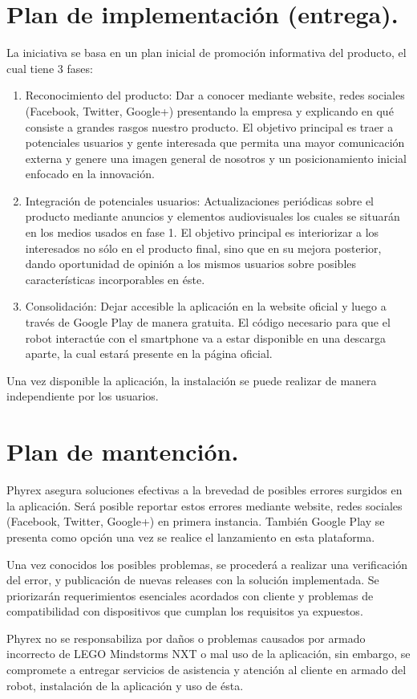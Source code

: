 \section{Plan de implementaci\'on (entrega).}
La iniciativa se basa en un plan inicial de promoci\'on informativa del producto, el cual tiene 3 fases:

\begin{enumerate}
\item Reconocimiento del producto: Dar a conocer mediante website, redes sociales (Facebook, Twitter, Google+) presentando la empresa y explicando en qu\'e consiste a grandes rasgos nuestro producto. El objetivo principal es traer a potenciales usuarios y gente interesada que permita una mayor comunicaci\'on externa y genere una imagen general de nosotros y un posicionamiento inicial enfocado en la innovaci\'on.
\item Integraci\'on de potenciales usuarios: Actualizaciones peri\'odicas sobre el producto mediante anuncios y elementos audiovisuales los cuales se situar\'an en los medios usados en fase 1. El objetivo principal es interiorizar a los interesados no s\'olo en el producto final, sino que en su mejora posterior, dando oportunidad de opini\'on a los mismos usuarios sobre posibles caracter\'isticas incorporables en \'este.
\item Consolidaci\'on: Dejar accesible la aplicaci\'on en la website oficial y luego a trav\'es de Google Play de manera gratuita. El c\'odigo necesario para que el robot interact\'ue con el smartphone va a estar disponible en una descarga aparte, la cual estar\'a presente en la p\'agina oficial.
\end{enumerate}

Una vez disponible la aplicaci\'on, la instalaci\'on se puede realizar de manera independiente por los usuarios.


\newpage
\section{Plan de mantenci\'on.}
Phyrex asegura soluciones efectivas a la brevedad de posibles errores surgidos en la aplicaci\'on. Ser\'a posible reportar estos errores mediante website, redes sociales (Facebook, Twitter, Google+) en primera instancia. Tambi\'en Google Play se presenta como opci\'on una vez se realice el lanzamiento en esta plataforma.

Una vez conocidos los posibles problemas, se proceder\'a a realizar una verificaci\'on del error, y publicaci\'on de nuevas releases con la soluci\'on implementada. Se priorizar\'an requerimientos esenciales acordados con cliente y problemas de compatibilidad con dispositivos que cumplan los requisitos ya expuestos.

Phyrex no se responsabiliza por da\~nos o problemas causados por armado incorrecto de LEGO Mindstorms NXT o mal uso de la aplicaci\'on, sin embargo, se compromete a entregar servicios de asistencia y atenci\'on al cliente en armado del robot, instalaci\'on de la aplicaci\'on y uso de \'esta.

\newpage

